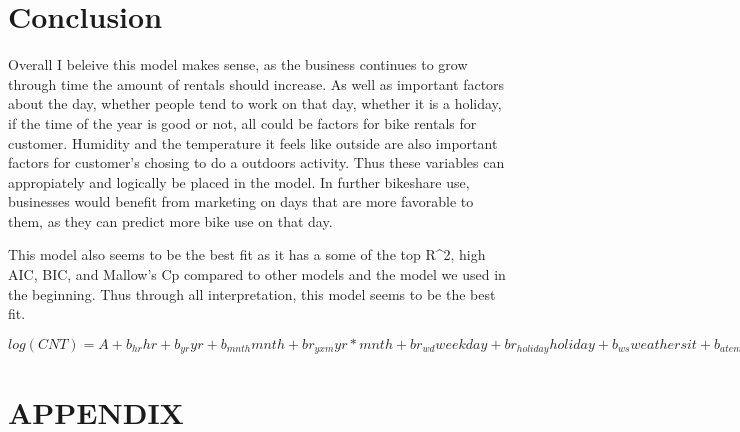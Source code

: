 \documentclass[]{article}
\newenvironment{Shaded}{\begin{snugshade}}{\end{snugshade}}
\newcommand{\KeywordTok}[1]{\textcolor[rgb]{0.13,0.29,0.53}{\textbf{#1}}}
\newcommand{\DataTypeTok}[1]{\textcolor[rgb]{0.13,0.29,0.53}{#1}}
\newcommand{\DecValTok}[1]{\textcolor[rgb]{0.00,0.00,0.81}{#1}}
\newcommand{\StringTok}[1]{\textcolor[rgb]{0.31,0.60,0.02}{#1}}
\newcommand{\OperatorTok}[1]{\textcolor[rgb]{0.81,0.36,0.00}{\textbf{#1}}}
\newcommand{\NormalTok}[1]{#1}
\begin{document}
\section{Conclusion}\label{conclusion}

Overall I beleive this model makes sense, as the business continues to
grow through time the amount of rentals should increase. As well as
important factors about the day, whether people tend to work on that
day, whether it is a holiday, if the time of the year is good or not,
all could be factors for bike rentals for customer. Humidity and the
temperature it feels like outside are also important factors for
customer's chosing to do a outdoors activity. Thus these variables can
appropiately and logically be placed in the model. In further bikeshare
use, businesses would benefit from marketing on days that are more
favorable to them, as they can predict more bike use on that day.

This model also seems to be the best fit as it has a some of the top
R\^{}2, high AIC, BIC, and Mallow's Cp compared to other models and the
model we used in the beginning. Thus through all interpretation, this
model seems to be the best fit.

\(log(CNT) = A + b_{hr} hr + b_{yr} yr + b_{mnth} mnth + br_{yxm} yr*mnth + br_{wd} weekday + br_{holiday} holiday + b_{ws} weathersit + b_{atemp} atemp + br_{hum} hum\)

\newpage

\section{APPENDIX}\label{appendix}

\begin{Shaded}
\end{Shaded}
\end{document}
